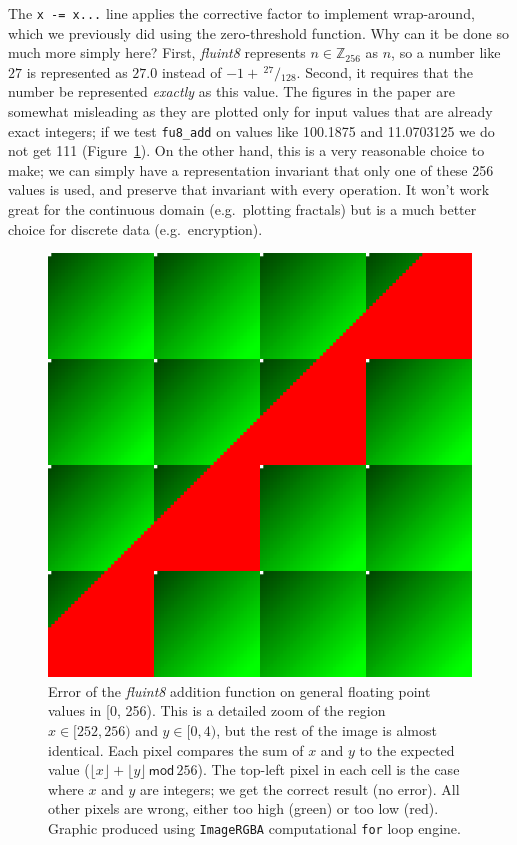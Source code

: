 \documentclass[twocolumn]{article}
\newcommand\sfrac[2]{\!{}\,^{#1}\!/{}\!_{#2}}
\begin{document}
The \verb|x -= x...| line applies the corrective factor to implement
wrap-around, which we previously did using the zero-threshold function.
Why can it be done so much more simply here? First, {\it fluint8}
represents $n \in \mathbb{Z}_{256}$ as $n$, so a number like $27$ is
represented as $27.0$ instead of $-1 + \sfrac{27}{128}$.
Second, it
requires that the number be represented {\em exactly} as this value.
The figures in the paper are somewhat misleading as they are plotted
only for input values that are already exact integers; if we test
\verb+fu8_add+ on values like 100.1875 and 11.0703125 we do not get
111 (Figure~\ref{fig:adderrordetail}). On the other hand, this is a
very reasonable choice to make; we can simply have a representation
invariant that only one of these 256 values is used, and preserve that
invariant with every operation. It won't work great for the continuous
domain (e.g.~plotting fractals) but is a much better choice for
discrete data (e.g.~encryption).

\begin{figure}[htp]
  \begin{center}
    \includegraphics[width=0.75 \linewidth]{add-error-detail}
  \end{center}
  \caption { Error of the {\it fluint8} addition function on general
    floating point values in [0, 256). This is a detailed zoom of the
      region $x \in [252, 256)$ and $y \in [0, 4)$, but the rest of
          the image is almost identical. Each pixel compares the sum
          of $x$ and $y$ to the expected value ($\lfloor x \rfloor +
          \lfloor y \rfloor \,\textsf{mod}\, 256$). The top-left pixel in
          each cell is the case where $x$ and $y$ are integers; we get
          the correct result (no error). All other pixels are wrong,
          either too high (green) or too low (red).
          Graphic produced using {\tt ImageRGBA} computational
          {\tt for} loop engine.
  } \label{fig:adderrordetail}
\end{figure}
\end{document}
